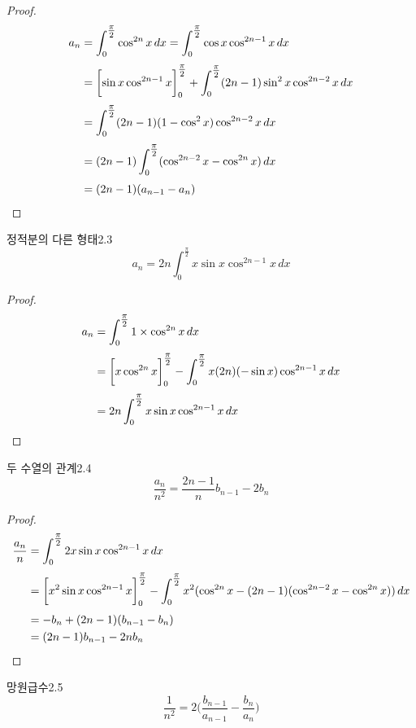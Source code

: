 \documentclass{article}
\begin{document}
\begin{proof}
	\begin{align*}
		a_n&=\int_0^{\tfrac{\pi}{2}}\cos^{2n}x\,dx=\int_0^{\tfrac{\pi}{2}}\cos x\cos^{2n-1}x\,dx\\[3pt]
		&=\biggl[\sin x\cos^{2n-1}x\biggr]_0^{\tfrac{\pi}{2}}+\int_0^{\tfrac{\pi}{2}}(2n-1)\sin^2x\cos^{2n-2}x\,dx\\[3pt]
		&=\int_0^{\tfrac{\pi}{2}}(2n-1)(1-\cos^2x)\cos^{2n-2}x\,dx\\[3pt]
		&=(2n-1)\int_0^{\tfrac{\pi}{2}}(\cos^{2n-2}x-\cos^{2n}x)\,dx\\[3pt]
		&=(2n-1)(a_{n-1}-a_n)\qedhere
	\end{align*}
\end{proof}

\begin{thm}{정적분의 다른 형태}{2.3}
	\[
		a_n=2n\int_0^{\tfrac{\pi}{2}}x\sin x\cos^{2n-1}x\,dx
	\]
\end{thm}

\begin{proof}
	\begin{align*}
		a_n&=\int_0^{\tfrac{\pi}{2}}1\times\cos^{2n}x\,dx\\[3pt]
		&=\biggl[x\cos^{2n}x\biggr]_0^{\tfrac{\pi}{2}}-\int_0^{\tfrac{\pi}{2}}x(2n)(-\sin x)\cos^{2n-1}x\,dx\\[3pt]
		&=2n\int_0^{\tfrac{\pi}{2}}x\sin x\cos^{2n-1}x\,dx\qedhere
	\end{align*}
\end{proof}

\begin{thm}{두 수열의 관계}{2.4}
	\[
		\frac{a_n}{n^2}=\frac{2n-1}{n}b_{n-1}-2b_n
	\]
\end{thm}

\begin{proof}
	\begin{align*}
		\frac{a_n}{n}&=\int_0^{\tfrac{\pi}{2}}2x\sin x\cos^{2n-1}x\,dx\\[3pt]
		&=\biggl[x^2\sin x\cos^{2n-1}x\biggr]_0^{\tfrac{\pi}{2}}-\int_0^{\tfrac{\pi}{2}}x^2(\cos^{2n}x-(2n-1)(\cos^{2n-2}x-\cos^{2n}x))\,dx\\[3pt]
		&=-b_n+(2n-1)(b_{n-1}-b_n)\\
		&=(2n-1)b_{n-1}-2nb_n\qedhere
	\end{align*}
\end{proof}

\newpage
\begin{thm}{망원급수}{2.5}
	\[
		\frac{1}{n^2}=2\biggl(\frac{b_{n-1}}{a_{n-1}}-\frac{b_n}{a_n}\biggr)
	\]
\end{thm}
\end{document}
